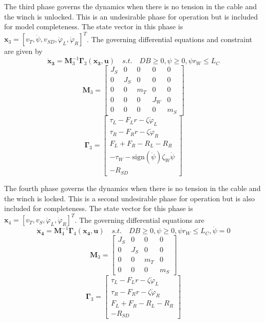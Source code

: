 The third phase governs the dynamics when there is no tension in the cable and the winch is unlocked. This is an undesirable phase for operation but is included for model completeness. The state vector in this phase is $\mathbf{x}_3 = [v_T, \dot\psi, v_{SD}, \dot\varphi_L, \dot\varphi_R]^T$. The governing differential equations and constraint are given by
\begin{equation}
    \mathbf{\dot x_3} = \mathbf{M}_3^{-1}\mathbf{\Gamma}_3(\mathbf{x_3},\mathbf{u}) \quad s.t. \quad DB\geq0, \psi\geq0, \psi r_W \leq L_C
\end{equation}
\begin{equation}
     \mathbf{M}_3 = \begin{bmatrix} J_S & 0 & 0 & 0 & 0 \\ 0 & J_S & 0 & 0 & 0  \\ 0 & 0 & m_T & 0 & 0  \\ 0 & 0 & 0 & J_W & 0  \\ 0 & 0 & 0 & 0 & m_S \end{bmatrix}
\end{equation}
\begin{equation}
     \mathbf{\Gamma}_3 = \begin{bmatrix} \tau_L - F_Lr - \zeta\dot\varphi_L \\ \tau_R - F_Rr - \zeta\dot\varphi_R \\ F_L + F_R - R_L - R_R \\ -\tau_W - \text{sign}(\dot\psi)\zeta_W\dot\psi \\ -R_{SD} \end{bmatrix}
\end{equation}

The fourth phase governs the dynamics when there is no tension in the cable and the winch is locked. This is a second undesirable phase for operation but is also included for completeness. The state vector for this phase is $\mathbf{x}_4 = [v_T, v_S, \dot\varphi_L, \dot\varphi_R]^T$. The governing differential equations are
\begin{equation}
    \mathbf{\dot x_4} = \mathbf{M}_4^{-1}\mathbf{\Gamma}_4(\mathbf{x_4},\mathbf{u}) \quad s.t. \quad DB\geq0, \psi\geq0, \psi r_W \leq L_C, \dot\psi = 0
\end{equation}
\begin{equation}
     \mathbf{M}_3 = \begin{bmatrix} J_S & 0 & 0 & 0 \\ 0 & J_S & 0 & 0 \\ 0 & 0 & m_T & 0 \\  0 & 0 & 0 & m_S \end{bmatrix}
\end{equation}
\begin{equation}
     \mathbf{\Gamma}_3 = \begin{bmatrix} \tau_L - F_Lr - \zeta\dot\varphi_L \\ \tau_R - F_Rr - \zeta\dot\varphi_R \\ F_L + F_R - R_L - R_R \\ -R_{SD} \end{bmatrix}
\end{equation}

